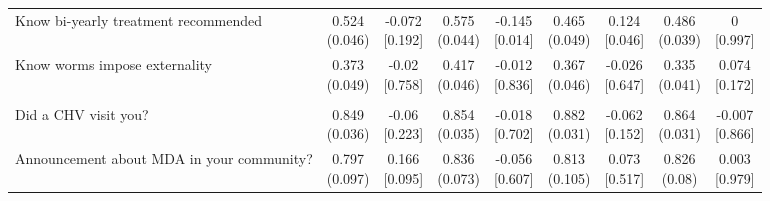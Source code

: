 {\begin{tabular}[t]{lcccccccc}
\hspace{1em}Know bi-yearly treatment recommended & \makecell[c]{0.524\\(0.046)} & \makecell[c]{-0.072\\{[0.192]}} & \makecell[c]{0.575\\(0.044)} & \makecell[c]{-0.145\\{[0.014]}} & \makecell[c]{0.465\\(0.049)} & \makecell[c]{0.124\\{[0.046]}} & \makecell[c]{0.486\\(0.039)} & \makecell[c]{0\\{[0.997]}}\\
\hspace{1em}Know worms impose externality & \makecell[c]{0.373\\(0.049)} & \makecell[c]{-0.02\\{[0.758]}} & \makecell[c]{0.417\\(0.046)} & \makecell[c]{-0.012\\{[0.836]}} & \makecell[c]{0.367\\(0.046)} & \makecell[c]{-0.026\\{[0.647]}} & \makecell[c]{0.335\\(0.041)} & \makecell[c]{0.074\\{[0.172]}}\\
\addlinespace[0.3em]
\hline
\multicolumn{9}{l}{\textit{\textbf{Panel D: Implementation, $N=2,659$}}}\\
\hline
\hspace{1em}Did a CHV visit you? & \makecell[c]{0.849\\(0.036)} & \makecell[c]{-0.06\\{[0.223]}} & \makecell[c]{0.854\\(0.035)} & \makecell[c]{-0.018\\{[0.702]}} & \makecell[c]{0.882\\(0.031)} & \makecell[c]{-0.062\\{[0.152]}} & \makecell[c]{0.864\\(0.031)} & \makecell[c]{-0.007\\{[0.866]}}\\
\hspace{1em}Announcement about MDA in your community? & \makecell[c]{0.797\\(0.097)} & \makecell[c]{0.166\\{[0.095]}} & \makecell[c]{0.836\\(0.073)} & \makecell[c]{-0.056\\{[0.607]}} & \makecell[c]{0.813\\(0.105)} & \makecell[c]{0.073\\{[0.517]}} & \makecell[c]{0.826\\(0.08)} & \makecell[c]{0.003\\{[0.979]}}\\

\end{tabular}}
